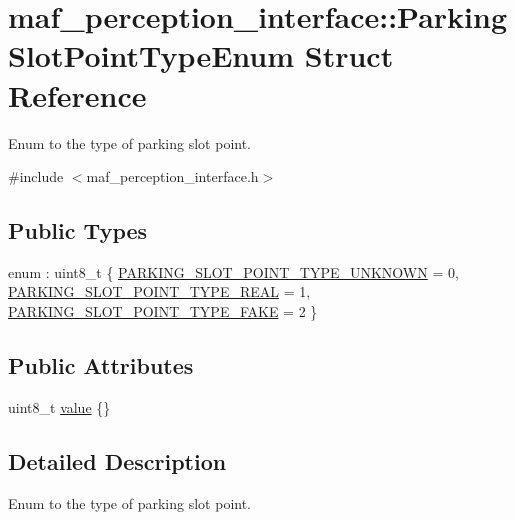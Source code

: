 \hypertarget{structmaf__perception__interface_1_1ParkingSlotPointTypeEnum}{}\section{maf\+\_\+perception\+\_\+interface\+:\+:Parking\+Slot\+Point\+Type\+Enum Struct Reference}
\label{structmaf__perception__interface_1_1ParkingSlotPointTypeEnum}


Enum to the type of parking slot point.  




{\ttfamily \#include $<$maf\+\_\+perception\+\_\+interface.\+h$>$}

\subsection*{Public Types}
\begin{DoxyCompactItemize}
\item 
enum \+: uint8\+\_\+t \{ \hyperlink{structmaf__perception__interface_1_1ParkingSlotPointTypeEnum_a972ab4d94aa6fe276b0cc09c7fca9e6da0602f236c67f0bcca37d1baa69b17059}{P\+A\+R\+K\+I\+N\+G\+\_\+\+S\+L\+O\+T\+\_\+\+P\+O\+I\+N\+T\+\_\+\+T\+Y\+P\+E\+\_\+\+U\+N\+K\+N\+O\+WN} = 0, 
\hyperlink{structmaf__perception__interface_1_1ParkingSlotPointTypeEnum_a972ab4d94aa6fe276b0cc09c7fca9e6da4bfe0c4b9b9b6810d71f31934f991221}{P\+A\+R\+K\+I\+N\+G\+\_\+\+S\+L\+O\+T\+\_\+\+P\+O\+I\+N\+T\+\_\+\+T\+Y\+P\+E\+\_\+\+R\+E\+AL} = 1, 
\hyperlink{structmaf__perception__interface_1_1ParkingSlotPointTypeEnum_a972ab4d94aa6fe276b0cc09c7fca9e6daa14b8b7eac1ed5402eb1553e97f5c177}{P\+A\+R\+K\+I\+N\+G\+\_\+\+S\+L\+O\+T\+\_\+\+P\+O\+I\+N\+T\+\_\+\+T\+Y\+P\+E\+\_\+\+F\+A\+KE} = 2
 \}
\end{DoxyCompactItemize}
\subsection*{Public Attributes}
\begin{DoxyCompactItemize}
\item 
uint8\+\_\+t \hyperlink{structmaf__perception__interface_1_1ParkingSlotPointTypeEnum_ac1b153657cc8d7858faaf3c34bb504a2}{value} \{\}
\end{DoxyCompactItemize}


\subsection{Detailed Description}
Enum to the type of parking slot point. 

